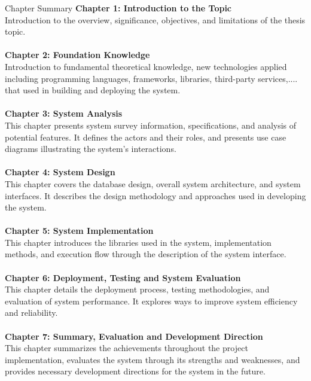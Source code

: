 \begin{preface}{Chapter Summary}
  \textbf{Chapter 1: Introduction to the Topic}
  \\
  Introduction to the overview, significance, objectives, and limitations of the thesis topic.
  \\
  \\
  \textbf{Chapter 2: Foundation Knowledge}
  \\
  Introduction to fundamental theoretical knowledge, new technologies applied including programming languages, frameworks, libraries, third-party services,.... that used in building and deploying the system.
  \\
  \\
  \textbf{Chapter 3: System Analysis}
  \\
  This chapter presents system survey information, specifications, and analysis of potential features. It defines the actors and their roles, and presents use case diagrams illustrating the system's interactions.
  \\
  \\
  \textbf{Chapter 4: System Design}
  \\
  This chapter covers the database design, overall system architecture, and system interfaces. It describes the design methodology and approaches used in developing the system.
  \\
  \\
  \textbf{Chapter 5: System Implementation}
  \\
  This chapter introduces the libraries used in the system, implementation methods, and execution flow through the description of the system interface.
  \\
  \\
  \textbf{Chapter 6: Deployment, Testing and System Evaluation}
  \\
  This chapter details the deployment process, testing methodologies, and evaluation of system performance. It explores ways to improve system efficiency and reliability.
  \\
  \\
  \textbf{Chapter 7: Summary, Evaluation and Development Direction}
  \\
  This chapter summarizes the achievements throughout the project implementation, evaluates the system through its strengths and weaknesses, and provides necessary development directions for the system in the future.
  \end{preface}